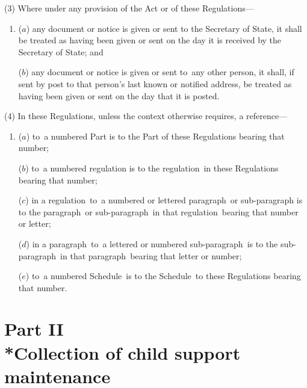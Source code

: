 \documentclass[12pt,a4paper]{article}
\begin{document}
(3) Where under any provision of the Act or of these Regulations—
\begin{enumerate}\item[]
($a$) any document or notice is given or sent to the Secretary of State, it shall be treated as having been given or sent on the day it is received by the Secretary of State; and

($b$) any document or notice is given or sent to~any other person, it shall, if sent by post to that person’s last known or notified address, be treated as having been given or sent on 
the day that it is posted.  %
\end{enumerate}

(4) In these Regulations, unless the context otherwise requires, a reference—
\begin{enumerate}\item[]
($a$) to~a numbered Part is to the Part of these Regulations bearing that number;

($b$) to~a numbered regulation is to the regulation~in these Regulations bearing that number;

($c$) in a regulation~to~a numbered or lettered paragraph~or sub-paragraph is to the paragraph~or sub-paragraph~in that regulation~bearing that number or letter;

($d$) in a paragraph~to~a lettered or numbered sub-paragraph~is to the sub-paragraph~in that paragraph~bearing that letter or number;

($e$) to~a numbered Schedule~is to the Schedule~to these Regulations bearing that number.
\end{enumerate}


\section[Part II --- Collection of child support maintenance]{Part II\\*Collection of child support maintenance}
\end{document}
